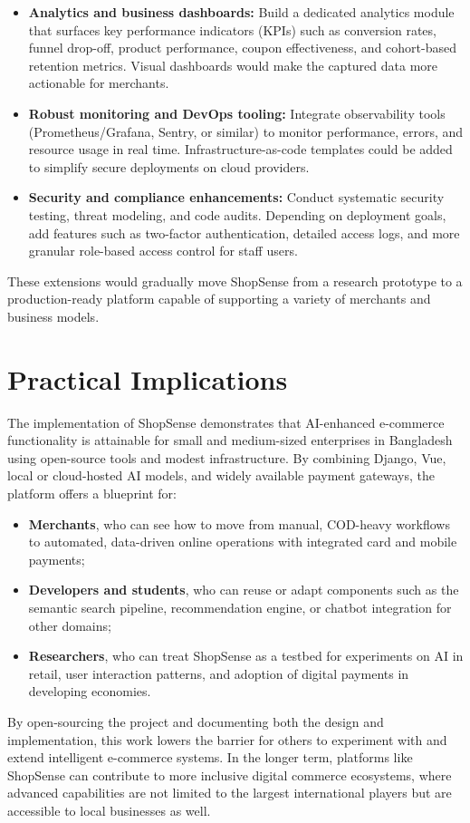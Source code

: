 \begin{itemize}
  \item \textbf{Analytics and business dashboards:} Build a dedicated analytics module that surfaces key performance indicators (KPIs) such as conversion rates, funnel drop-off, product performance, coupon effectiveness, and cohort-based retention metrics. Visual dashboards would make the captured data more actionable for merchants.
  \item \textbf{Robust monitoring and DevOps tooling:} Integrate observability tools  \\(Prometheus/Grafana, Sentry, or similar) to monitor performance, errors, and resource usage in real time. Infrastructure-as-code templates could be added to simplify secure deployments on cloud providers.
  \item \textbf{Security and compliance enhancements:} Conduct systematic security testing, threat modeling, and code audits. Depending on deployment goals, add features such as two-factor authentication, detailed access logs, and more granular role-based access control for staff users.
\end{itemize}

These extensions would gradually move ShopSense from a research prototype to a production-ready platform capable of supporting a variety of merchants and business models.

\section{Practical Implications}

The implementation of ShopSense demonstrates that AI-enhanced e-commerce functionality is attainable for small and medium-sized enterprises in Bangladesh using open-source tools and modest infrastructure. By combining Django, Vue, local or cloud-hosted AI models, and widely available payment gateways, the platform offers a blueprint for:

\begin{itemize}
  \item \textbf{Merchants}, who can see how to move from manual, COD-heavy workflows to automated, data-driven online operations with integrated card and mobile payments;
  \item \textbf{Developers and students}, who can reuse or adapt components such as the semantic search pipeline, recommendation engine, or chatbot integration for other domains;
  \item \textbf{Researchers}, who can treat ShopSense as a testbed for experiments on AI in retail, user interaction patterns, and adoption of digital payments in developing economies.
\end{itemize}

By open-sourcing the project and documenting both the design and implementation, this work lowers the barrier for others to experiment with and extend intelligent e-commerce systems. In the longer term, platforms like ShopSense can contribute to more inclusive digital commerce ecosystems, where advanced capabilities are not limited to the largest international players but are accessible to local businesses as well.